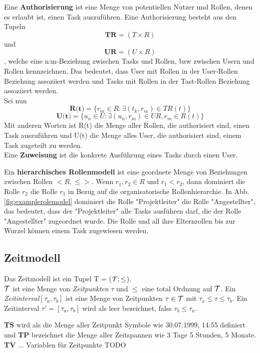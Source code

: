 Eine \textbf{Authorisierung} ist eine Menge von potentiellen Nutzer und Rollen, denen es erlaubt ist, einen Task auszuführen. Eine Authorisierung besteht aus den Tupeln $$\textbf{TR} = (T\times R)$$ und $$\textbf{UR} = (U\times R)$$, welche eine n:m-Beziehung zwischen Tasks und Rollen, bzw zwischen Usern und Rollen kennzeichnen. Das bedeutet, dass User mit Rollen in der User-Rollen Beziehung assoziiert werden und Tasks mit Rollen in der Tast-Rollen Beziehung assoziiert werden.\\
Sei nun $$\textbf{R(t)} = \{r_m \in R: \exists(t_k, r_m) \in TR(t)\}$$
$$\textbf{U(t)} = \{u_n \in U: \exists(u_n, r_m) \in UR, r_m \in R(t)\}$$
Mit anderen Worten ist R(t) die Menge aller Rollen, die authorisiert sind, einen Task auszuführen und U(t) die Menge alles User, die authorisiert sind, einem Task zugeteilt zu werden.\\
Eine \textbf{Zuweisung} ist die konkrete Ausführung eines Tasks durch einen User.

Ein \textbf{hierarchisches Rollenmodell} ist eine geordnete Menge von Beziehungen zwischen Rollen $<R, \leq>$. Wenn $r_1, r_2 \in R$ und $r_1 < r_2$, dann dominiert die Rolle $r_2$ die Rolle $r_1$ in Bezug auf die organisatorische Rollenhierarchie. In Abb. \ref{fig:examplerolemodel} dominiert die Rolle "Projektleiter" die Rolle "Angestellter", das bedeutet, dass der "Projektleiter" alle Tasks ausführen darf, die der Rolle "Angestellter" zugeordnet wurde.
Die Rolle und all ihre Elternrollen bis zur Wurzel können einem Task zugewiesen werden.

\cite{wolter_modeling_of_TBAC_in_BPMN}

\subsection{Zeitmodell}
Das Zeitmodell ist ein Tupel T = ($\mathcal{T};\leq$).\\
$\mathcal{T}$ ist eine Menge von \textit{Zeitpunkten} $\tau$ und $\leq$ eine total Ordnung auf $\mathcal{T}$.
Ein \textit{Zeitinterval}$[\tau_a, \tau_b]$ ist eine Menge von Zeitpunkten $\tau \in \mathcal{T}$ mit $\tau_a \leq \tau \leq \tau_b$.
Ein Zeitinterval $\tau' = [\tau_a, \tau_b]$ wird als leer bezeichnet, falss $\tau_b \leq \tau_a$.

\textbf{TS} wird als die Menge aller Zeitpunkt Symbole wie 30.07.1999, 14:55 definiert und \textbf{TP} bezeichnet die Menge aller Zeitspannen wie 3 Tage 5 Stunden, 5 Monate. \textbf{TV} ... Variablen für Zeitpunkte TODO


